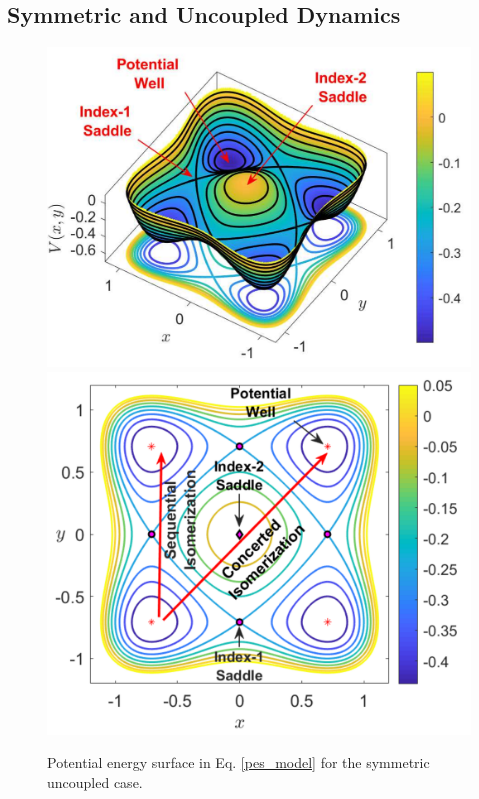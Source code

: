 \documentclass[10pt,aps,onecolumn,superscriptaddress]{revtex4-2}
\begin{document}
\subsection{Symmetric and Uncoupled Dynamics}

\begin{figure}[htbp]
	\begin{center}
	\includegraphics[scale=0.35]{pes_symm}
	\includegraphics[scale=0.39]{pes_symm_conts}
	\end{center}
	\caption{Potential energy surface in Eq. \eqref{pes_model} for the symmetric  uncoupled case.}
	\label{PES_isom_rout}
\end{figure}
\end{document}
